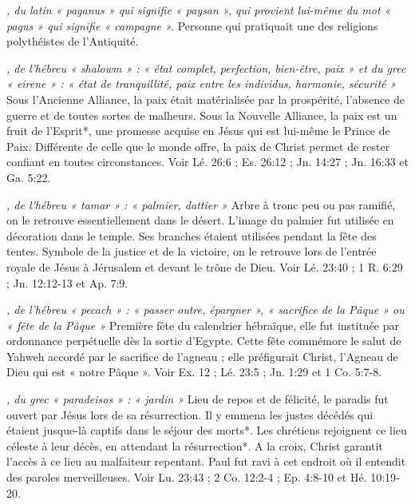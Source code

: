 \begin{multicols}{2}
\textit{, du latin « paganus » qui signifie « paysan », qui provient lui-même du mot « pagus » qui signifie « campagne ».}\newline
Personne qui pratiquait une des religions polythéistes de l'Antiquité.

\textit{, de l'hébreu « shalowm » : « état complet, perfection, bien-être, paix » et du grec « eirene » : « état de tranquillité, paix entre les individus, harmonie, sécurité »}\newline
Sous l'Ancienne Alliance, la paix était matérialisée par la prospérité, l'absence de guerre et de toutes sortes de malheurs. Sous la Nouvelle Alliance, la paix est un fruit de l'Esprit*, une promesse acquise en Jésus qui est lui-même le Prince de Paix. Différente de celle que le monde offre, la paix de Christ permet de rester confiant en toutes circonstances. Voir Lé. 26:6 ; Es. 26:12 ; Jn. 14:27 ; Jn. 16:33 et Ga. 5:22.

\textit{, de l'hébreu « tamar » : « palmier, dattier »}\newline
Arbre à tronc peu ou pas ramifié, on le retrouve essentiellement dans le désert. L'image du palmier fut utilisée en décoration dans le temple. Ses branches étaient utilisées pendant la fête des tentes. Symbole de la justice et de la victoire, on le retrouve lors de l'entrée royale de Jésus à Jérusalem et devant le trône de Dieu. Voir Lé. 23:40 ; 1 R. 6:29 ; Jn. 12:12-13 et Ap. 7:9.

\textit{, de l'hébreu « pecach » : « passer outre, épargner », « sacrifice de la Pâque » ou « fête de la Pâque »}\newline
Première fête du calendrier hébraïque, elle fut instituée par ordonnance perpétuelle dès la sortie d'Egypte. Cette fête commémore le salut de Yahweh accordé par le sacrifice de l'agneau ; elle préfigurait Christ, l'Agneau de Dieu qui est « notre Pâque ». Voir Ex. 12 ; Lé. 23:5 ; Jn. 1:29 et 1 Co. 5:7-8.

\textit{, du grec « paradeisos » : « jardin »}\newline
Lieu de repos et de félicité, le paradis fut ouvert par Jésus lors de sa résurrection. Il y emmena les justes décédés qui étaient jusque-là captifs dans le séjour des morts*. Les chrétiens rejoignent ce lieu céleste à leur décès, en attendant la résurrection*. A la croix, Christ garantit l'accès à ce lieu au malfaiteur repentant. Paul fut ravi à cet endroit où il entendit des paroles merveilleuses. Voir Lu. 23:43 ; 2 Co. 12:2-4 ; Ep. 4:8-10 et Hé. 10:19-20.


\end{multicols}
